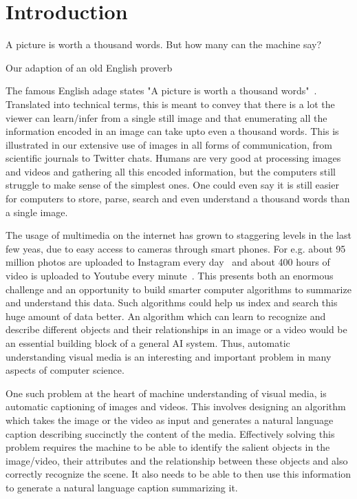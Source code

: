 \chapter{Introduction}
\label{chapter:intro}
\setlength{\epigraphwidth}{\textwidth}
\epigraph{A picture is worth a thousand words. But how many can the machine
say?}{Our adaption of an old English proverb}

The famous English adage states "A picture is worth a thousand
words"~\cite{ThousandQuote}.
Translated into technical terms, this is meant to convey that there is a lot the
viewer can learn/infer from a single still image and that enumerating all the
information encoded in an image can take upto even a thousand words.
This is illustrated in our extensive use of images in all forms of
communication, from scientific journals to Twitter chats. 
%
Humans are very good at processing images and videos and gathering all this
encoded information, but the computers still struggle to make sense of the
simplest ones.
%
One could even say it is still easier for computers to store, parse, search and
even understand a thousand words than a single image.
%

The usage of multimedia on the internet has grown to staggering levels in the
last few yeas, due to easy access to cameras through smart phones.
For e.g. about 95 million photos are uploaded to Instagram every
day~\cite{InstStats} and about 400 hours of video is uploaded to Youtube every
minute~\cite{YouStats}.
This presents both an enormous challenge and an opportunity to build smarter
computer algorithms to summarize and understand this data.
Such algorithms could help us index and search this huge amount of data better.
An algorithm which can learn to recognize and describe different objects and
their relationships in an image or a video would be an essential building block
of a general AI system.
Thus, automatic understanding visual media is an interesting and important
problem in many aspects of computer science.
%

One such problem at the heart of machine understanding of visual media, is
automatic captioning of images and videos.
This involves designing an algorithm which takes the image or the video as input
and generates a natural language caption describing succinctly the content of
the media.
Effectively solving this problem requires the machine to be able to identify the
salient objects in the image/video, their attributes and the relationship
between these objects and also correctly recognize the scene.
It also needs to be able to then use this information to generate a natural language
caption summarizing it.

